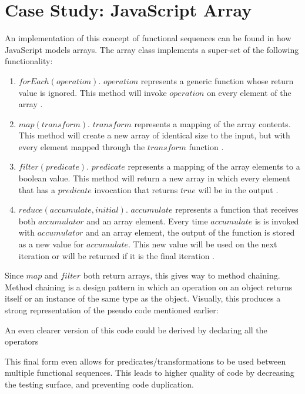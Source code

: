 \section{Case Study: JavaScript Array}

An implementation of this concept of functional sequences can be found in how JavaScript models arrays.  The array class implements a super-set of the following functionality:

\begin{enumerate}
  \item $forEach(operation)$.  $operation$ represents a generic function whose return value is ignored.  This method will invoke $operation$ on every element of the array \cite{arrayforeach16}.

  \item $map(transform)$.  $transform$ represents a mapping of the array contents.  This method will create a new array of identical size to the input, but with every element mapped through the $transform$ function \cite{arraymap16}.

  \item $filter(predicate)$.  $predicate$ represents a mapping of the array elements to a boolean value.  This method will return a new array in which every element that has a $predicate$ invocation that returns $true$ will be in the output \cite{arrayfilter16}.

  \item $reduce(accumulate, initial)$.  $accumulate$ represents a function that receives both $accumulator$ and an array element. Every time $accumulate$ is is invoked with $accumulator$ and an array element, the output of the function is stored as a new value for $accumulate$.  This new value will be used on the next iteration or will be returned if it is the final iteration \cite{arrayreduce16}.

\end{enumerate}

Since $map$ and $filter$ both return arrays, this gives way to method chaining. Method chaining is a design pattern in which an operation on an object returns itself or an instance of the same type as the object. Visually, this produces a strong representation of the pseudo code mentioned earlier:

\begin{minipage}{\linewidth}

\end{minipage} 

An even clearer version of this code could be derived by declaring all the operators

\begin{minipage}{\linewidth}

\end{minipage}

This final form even allows for predicates/transformations to be used between multiple functional sequences.  This leads to higher quality of code by decreasing the testing surface, and preventing code duplication. 